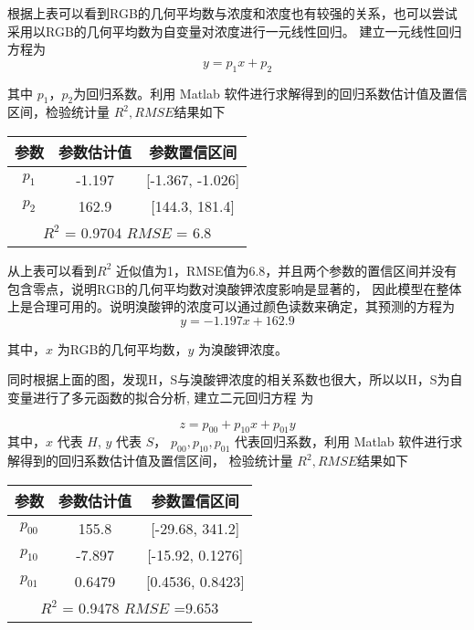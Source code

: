     根据上表可以看到RGB的几何平均数与浓度和浓度也有较强的关系，也可以尝试采用以RGB的几何平均数为自变量对浓度进行一元线性回归。
    建立一元线性回归方程为
     $$ y = p_1 x + p_2$$

    其中 $p_1，p_2$为回归系数。利用 Matlab 软件进行求解得到的回归系数估计值及置信区间，检验统计量 $R^2, RMSE $结果如下

    \begin{table}[H]
        \centering
        \begin{tabular}{|c|c|c|}
            \hline
            参数     & 参数估计值  & 参数置信区间        \\ 
            \hline
            $p_1$  & -1.197 & [-1.367, -1.026] \\
            \hline
            $p_2$  & 162.9 & [144.3, 181.4]   \\
            \hline
            \multicolumn{3}{|c|}{$R^2$ = 0.9704 $RMSE$ = 6.8}  \\                                            
            \hline
        \end{tabular}
        \end{table}

    从上表可以看到$R^2$ 近似值为1，RMSE值为6.8，并且两个参数的置信区间并没有包含零点，说明RGB的几何平均数对溴酸钾浓度影响是显著的，
    因此模型在整体上是合理可用的。说明溴酸钾的浓度可以通过颜色读数来确定，其预测的方程为
    $$ y = -1.197 x + 162.9 $$

    其中，$x$ 为RGB的几何平均数，$y$ 为溴酸钾浓度。

    同时根据上面的图，发现H，S与溴酸钾浓度的相关系数也很大，所以以H，S为自变量进行了多元函数的拟合分析,
    建立二元回归方程 为

    $$ z = p_{00} + p_{10} x + p_{01} y$$
    其中，$x$ 代表 $H$, $y$ 代表 $S$， $p_{00},p_{10},p_{01}$ 代表回归系数，利用 Matlab 软件进行求解得到的回归系数估计值及置信区间，
    检验统计量 $R^2, RMSE $结果如下

    \begin{table}[H]
        \centering
        \begin{tabular}{|c|c|c|}
            \hline
            参数     & 参数估计值  & 参数置信区间        \\ 
            \hline
            $p_00$  & 155.8 & [-29.68, 341.2] \\
            \hline
            $p_10$  & -7.897 & [-15.92, 0.1276]   \\
            \hline
            $p_01$  & 0.6479 & [0.4536, 0.8423]   \\
            \hline
            \multicolumn{3}{|c|}{$R^2$ = 0.9478 $RMSE$ =9.653}  \\                                            
            \hline
        \end{tabular}
        \end{table}

